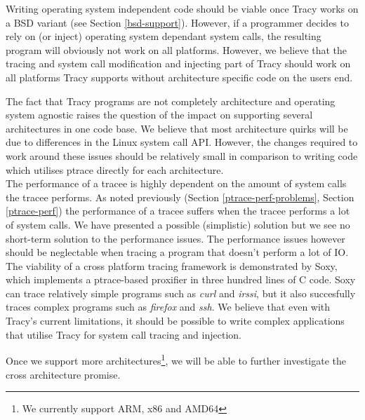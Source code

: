 \documentclass[a4paper, 10pt]{report}
\begin{document}
Writing operating system independent code should be viable once Tracy works on
a BSD variant (see Section \ref{bsd-support}). However, if a programmer decides
to rely on (or inject) operating system dependant system calls, the resulting
program will obviously not work on all platforms. However, we believe that the
tracing and system call modification and injecting part of Tracy should work on
all platforms Tracy supports without architecture specific code on the users
end.

The fact that Tracy programs are not completely architecture and operating system
agnostic raises the question of the impact on supporting several architectures
in one code base. We believe that most architecture quirks will be due to
differences in the Linux system call API. However, the changes required to work
around these issues should be relatively small in comparison to writing code
which utilises ptrace directly for each architecture. \\

The performance of a tracee is highly dependent on the amount of system calls
the tracee performs. As noted previously (Section \ref{ptrace-perf-problems},
Section \ref{ptrace-perf}) the performance of a tracee suffers when the tracee
performs a lot of system calls. We have presented a possible (simplistic)
solution but we see no short-term solution to the performance issues.
The performance issues however should be neglectable when tracing a program
that doesn't perform a lot of IO. \\

The viability of a cross platform tracing framework is demonstrated by Soxy,
which implements a ptrace-based proxifier in three hundred lines of C
code. Soxy can trace relatively simple programs such as \textit{curl} and
\textit{irssi}, but it also succesfully traces complex programs such as
\textit{firefox} and \textit{ssh}. We believe that even with Tracy's current
limitations, it should be possible to write complex applications that utilise
Tracy for system call tracing and injection.

Once we support more architectures\footnote{We currently support ARM, x86 and
AMD64}, we will be able to further investigate the cross architecture promise.



\pagebreak

\appendix
\addappheadtotoc
\end{document}
